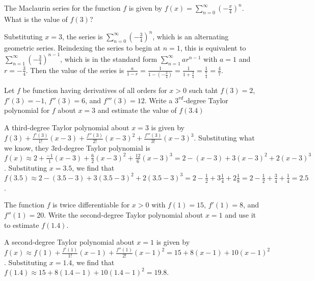\begin{Exercise} The Maclaurin series for the 
function $f$ is given by $f(x) = \sum_{n=0}^\infty \left( -\frac{x}{4} \right)^
n$. What is the value of $f(3)$?
\end{Exercise}

\begin{Answer}[ref = mac1]
Substituting $x = 3$, the series is $\sum_{n=0}^\infty \left( -\frac{3}{4} 
\right)^n$, which is an alternating geometric series. Reindexing the series to 
begin at $n = 1$, this is equivalent to $\sum_{n = 1}^\infty \left( - 
\frac{3}{4} \right) ^ {n - 1}$, which is in the standard form $\sum_{n=1}^
\infty ar^{n-1}$ with $a = 1$ and $r = -\frac{3}{4}$. Then the value of the 
series is $\frac{a}{1-r} = \frac{1}{1-\left(- \frac{3}{4} \right)} = \frac{1}{1 
+ \frac{3}{4}} = \frac{1}{\frac{7}{4}} = \frac{4}{7}$. 
\end{Answer}

\begin{Exercise} Let $f$ be function having 
derivatives of all orders for $x > 0$ such taht $f(3) = 2$, $f'(3) = -1$, 
$f''(3) = 6$, and $f'''(3) = 12$. Write a $3^{rd}$-degree Taylor polynomial 
for $f$ about $x = 3$ and estimate the value of $f(3.4)$
\end{Exercise}

\begin{Answer}[ref = taylor1]
A third-degree Taylor polynomial about $x = 3$ is given by $f(3) + \frac{
f'(3)}{1!} (x - 3) + \frac{f''(3)}{2!} (x - 3) ^ 2 + \frac{f'''(3)}{3!} (x - 3) 
^ 3$. Substituting what we know, they 3rd-degree Taylor polynomial is $f(x) 
\approx 2 + \frac{-1}{1} (x - 3) + \frac{6}{2} (x - 3) ^ 2 + \frac{12}{6}(x - 
3) ^ 3 = 2 - (x - 3) + 3 (x - 3) ^ 2 + 2 (x - 3) ^ 3$. Substituting $x = 3.5$, 
we find that $f(3.5) \approx 2 - (3.5 - 3) + 3 ( 3.5 - 3) ^ 2 + 2 (3.5 - 3) ^ 3 
= 2 - \frac{1}{2} + 3 \frac{1}{4} + 2\frac{1}{8} = 2 - \frac{1}{2} + 
\frac{3}{4} + \frac{1}{4} = 2.5$.
\end{Answer}

\begin{Exercise} The function $f$ is twice 
differentiable for $x > 0$ with $f(1) = 15$, $f'(1) = 8$, and $f''(1) = 20$. 
Write the second-degree Taylor polynomial about $x = 1$ and use it to 
estimate $f(1.4)$.
\end{Exercise}

\begin{Answer}
A second-degree Taylor polynomial about $x = 1$ is given by $f(x) \approx f(1) 
+ \frac{f'(1)}{1!}(x - 1) + \frac{f''(1)}{2!}(x - 1)^2 = 15 + 8(x - 1) + 10(x 
- 1)^2$. Substituting $x = 1.4$, we find that $f(1.4) \approx 15 + 8(1.4 - 1) 
+ 10(1.4 - 1)^2 = 19.8$.
\end{Answer}


